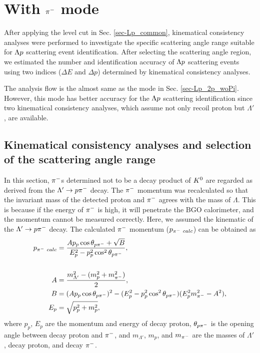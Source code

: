 \clearpage
\section{With $\pi^{-}$ mode}
\label{sec-Lp_2p_wPi}

After applying the  level cut in Sec. \ref{sec-Lp_common}, kinematical consistency analyses were performed to investigate the specific scattering angle range suitable for $\Lambda p$ scattering event identification. %
After selecting the scattering angle region, we estimated the number and identification accuracy of $\Lambda p$ scattering events using two indices ($\Delta E$ and $\Delta p$) determined by kinematical consistency analyses.

The analysis flow is the almost same as the  mode in Sec. \ref{sec-Lp_2p_woPi}. However, this  mode has better accuracy for the $\Lambda p$ scattering identification since two kinematical consistency analyses, which assume not only recoil proton but $\Lambda'$, are available. 



\subsection{Kinematical consistency analyses and selection of the scattering angle range}
\label{sec-2p_w_kine}

In this section, $\pi^{-}$s determined not to be a decay product of $K^{0}$ are regarded as derived from the $\Lambda'\to p\pi^{-}$ decay. 
The $\pi^{-}$ momentum was recalculated so that the invariant mass of the detected proton and $\pi^{-}$ agrees with the mass of $\Lambda$. This is because if the energy of $\pi^{-}$ is high, it will penetrate the BGO calorimeter, and the momentum cannot be measured correctly.
Here, we assumed the kinematic of the $\Lambda'\to p\pi^{-}$ decay. The calculated $\pi^{-}$ momentum ($p_{\pi^{-}\ calc}$) can be obtained as
\begin{align}
  p_{\pi^{-}\ calc} &= \frac{A p_{p} \cos{\theta_{p\pi^{-}}} + \sqrt{B}}{E_{p}^{2} - p_{p}^{2} \cos^{2}{\theta_{p\pi^{-}}}}, \\
  \nonumber \\
  A &= \frac{m_{\Lambda'}^{2} - (m_{p}^{2} + m_{\pi^{-}}^{2})}{2}, \\
  B &= (A p_{p} \cos{\theta_{p\pi^{-}}})^{2} - (E_{p}^{2} - p_{p}^{2} \cos^{2}{\theta_{p\pi^{-}}}) (E_{p}^{2} m_{\pi^{-}}^{2} - A^{2}), \\
  E_{p} &= \sqrt{p_{p}^{2} + m_{p}^{2}},
  \label{eq-pMmomrecal}
\end{align}
where $p_{p}$, $E_{p}$ are the momentum and energy of decay proton, $\theta_{p\pi^{-}}$ is the opening angle between decay proton and $\pi^{-}$, and $m_{\Lambda'}$, $m_{p}$, and $m_{\pi^{-}}$ are the masses of $\Lambda'$, decay proton, and decay $\pi^{-}$.


